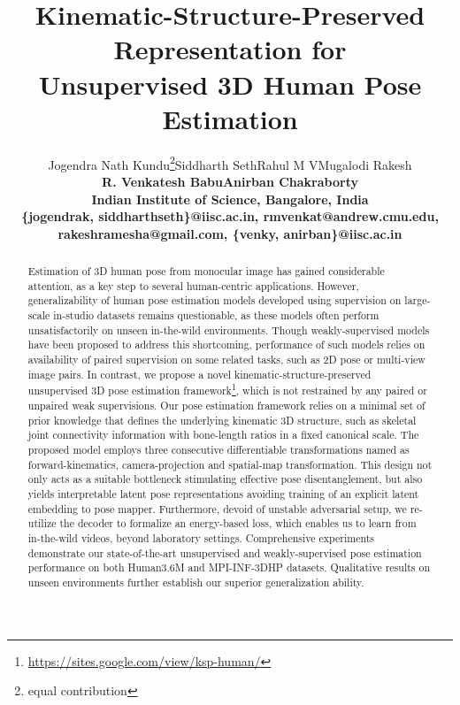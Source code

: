 \documentclass[letterpaper]{article} \usepackage{aaai20}  \usepackage{times}  \usepackage{helvet}  \usepackage{courier}  \usepackage{url}  \usepackage{graphicx}  \usepackage{amsmath}
\begin{document}
\title{Kinematic-Structure-Preserved Representation for \\Unsupervised 3D Human Pose Estimation}
\author{Jogendra Nath Kundu\thanks{equal contribution}\qquad Siddharth Seth\footnotemark[1]\qquad Rahul M V\footnotemark[1]\qquad Mugalodi Rakesh\qquad \\
\bf \Large R. Venkatesh Babu\qquad Anirban Chakraborty
\\
Indian Institute of Science, Bangalore, India\\
{\small \{jogendrak, siddharthseth\}@iisc.ac.in, rmvenkat@andrew.cmu.edu, rakeshramesha@gmail.com, \{venky, anirban\}@iisc.ac.in}}


\maketitle
\begin{abstract}
Estimation of 3D human pose from monocular image has gained considerable attention, as a key step to several human-centric applications. However, generalizability of human pose estimation models developed using supervision on large-scale in-studio datasets remains questionable, as these models often perform unsatisfactorily on unseen in-the-wild environments. Though weakly-supervised models have been proposed to address this shortcoming, performance of such models relies on availability of paired supervision on some related tasks, such as 2D pose or multi-view image pairs. In contrast, we propose a novel kinematic-structure-preserved unsupervised 3D pose estimation framework\footnote{{\url{https://sites.google.com/view/ksp-human/}}}, which is not restrained by any paired or unpaired weak supervisions. Our pose estimation framework relies on a minimal set of prior knowledge that defines the underlying kinematic 3D structure, such as skeletal joint connectivity information with bone-length ratios in a fixed canonical scale. The proposed model employs three consecutive differentiable transformations named as forward-kinematics, camera-projection and spatial-map transformation. This design not only acts as a suitable bottleneck stimulating effective pose disentanglement, but also yields interpretable latent pose representations avoiding training of an explicit latent embedding to pose mapper.  Furthermore, devoid of unstable adversarial setup, we re-utilize the decoder to formalize an energy-based loss, which enables us to learn from in-the-wild videos, beyond laboratory settings. Comprehensive experiments demonstrate our state-of-the-art unsupervised and weakly-supervised pose estimation performance on both Human3.6M and MPI-INF-3DHP datasets. Qualitative results on unseen environments further establish our superior generalization ability.


\end{abstract}
\end{document}
